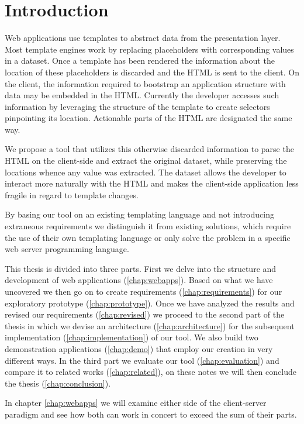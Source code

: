 \documentclass[thesis.tex]{subfiles}
\begin{document}
\chapter{Introduction}
\label{chap:intro}
Web applications use templates to abstract data from the presentation layer.
Most template engines work by replacing placeholders with corresponding values
in a dataset.
Once a template has been rendered the information about the location of these
placeholders is discarded and the HTML is sent to the client.
On the client, the information required to bootstrap an application structure
with data may be embedded in the HTML. Currently the developer accesses such
information by leveraging the structure of the template to create selectors
pinpointing its location. Actionable parts of the HTML are designated the same
way.

We propose a tool that utilizes this otherwise discarded information to parse
the HTML on the client-side and extract the original dataset, while preserving
the locations whence any value was extracted. The dataset allows the developer
to interact more naturally with the HTML and makes the client-side application
less fragile in regard to template changes.

By basing our tool on an existing templating language and not introducing
extraneous requirements we distinguish it from existing solutions,
which require the use of their own templating language or only solve the problem
in a specific web server programming language.


This thesis is divided into three parts. First we delve into the structure
and development of web applications (\ref{chap:webapps}). Based on what we have
uncovered we then go on to create requirements (\ref{chap:requirements}) for our
exploratory prototype (\ref{chap:prototype}).
Once we have analyzed the results and revised our requirements
(\ref{chap:revised}) we proceed to the second part of the thesis in which we
devise an architecture (\ref{chap:architecture}) for the subsequent
implementation (\ref{chap:implementation}) of our tool. We also build two
demonstration applications (\ref{chap:demo}) that employ our creation in very
different ways.
In the third part we evaluate our tool (\ref{chap:evaluation}) and
compare it to related works (\ref{chap:related}), on these notes we will then
conclude the thesis (\ref{chap:conclusion}).


In chapter \ref{chap:webapps} we will examine either side of the client-server
paradigm and see how both can work in concert to exceed the sum of their parts.
\end{document}
